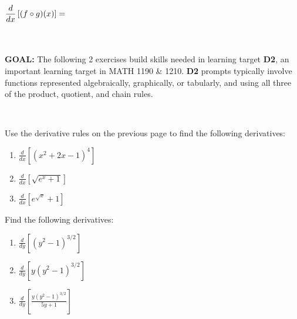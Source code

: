 \documentclass[10pt]{article}
\begin{document}
$\displaystyle \dfrac{d}{dx}\left[ (f\circ g)(x)\right]=$%
\\\\

\

{\bf\color{blue} GOAL:} The following 2 exercises build skills needed in learning target {\bf\color{ForestGreen}D2}, an important learning target in MATH 1190 \& 1210. {\bf\color{ForestGreen}D2} prompts typically involve functions represented algebraically, graphically, or tabularly, and using all three of the product, quotient, and chain rules.

\

{} Use the derivative rules on the previous page to find the following derivatives:

\begin{enumerate}

\item[(a)]$\displaystyle\frac{d}{dx}\left[ (x^2+2x-1)^4 \right]$

\vfill

\item[(b)] $\displaystyle\frac{d}{dx}\left[ \sqrt{e^x+1} \right]$

\vfill

\item[(c)] $\displaystyle\frac{d}{dx}\left[ e^{\sqrt{x}}+1 \right]$

\vfill

\end{enumerate}


\newpage%


 Find the following derivatives:

\begin{enumerate}
\item[(a)] $\displaystyle\frac{d}{dy}\left[ (y^2-1)^{3/2} \right]$

\vfill

\item[(b)] $\displaystyle\frac{d}{dy}\left[ y(y^2-1)^{3/2} \right]$

\vfill
\vfill

\item[(c)] $\displaystyle\frac{d}{dy}\left[ \frac{y(y^2-1)^{3/2}}{5y+1} \right]$

\vfill
\vfill
\vfill
\end{enumerate}
\end{document}
